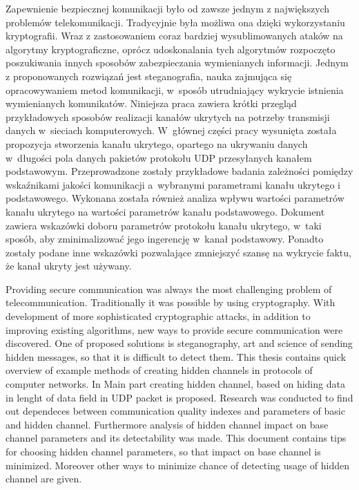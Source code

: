 \documentclass[a4paper, twoside, 12pt]{report}
\newenvironment{abstractpage}
  {\vspace*{\fill}\thispagestyle{empty}}
    {\vfill}
\renewenvironment{abstract}[1]
      {\bigskip\selectlanguage{#1}%
             \begin{center}\bfseries\abstractname\end{center}}
           {\par\bigskip}
\begin{document}



\begin{abstractpage}
\begin{abstract}{polish}
    Zapewnienie bezpiecznej komunikacji było od zawsze jednym z największych
    problemów telekomunikacji. Tradycyjnie była możliwa ona
    dzięki wykorzystaniu kryptografii. Wraz z zastosowaniem coraz bardziej wysublimowanych
    ataków na algorytmy kryptograficzne, oprócz udoskonalania tych algorytmów rozpoczęto
    poszukiwania innych sposobów zabezpieczania wymienianych informacji. Jednym
    z proponowanych rozwiązań jest steganografia, nauka zajmująca się opracowywaniem
    metod komunikacji, w~sposób utrudniający wykrycie istnienia wymienianych komunikatów.
    Niniejsza praca zawiera krótki przegląd przykładowych sposobów
    realizacji kanałów ukrytych na potrzeby transmisji danych w~sieciach komputerowych.
    W~głównej części pracy wysunięta została propozycja stworzenia kanału ukrytego, opartego na ukrywaniu
    danych w~długości pola danych pakietów protokołu UDP przesyłanych kanałem podstawowym.
    Przeprowadzone
    zostały przykładowe badania zależności pomiędzy wskaźnikami jakości komunikacji
    a~wybranymi parametrami kanału ukrytego i podstawowego. Wykonana została również
    analiza wpływu wartości parametrów kanału ukrytego na wartości parametrów kanału podstawowego.
    Dokument zawiera wskazówki doboru parametrów protokołu kanału ukrytego, w~taki sposób, aby
    zminimalizować jego ingerencję w~kanał podstawowy. Ponadto zostały podane inne
    wskazówki pozwalające zmniejszyć szansę na wykrycie faktu, że kanał ukryty jest
    używany.
\end{abstract}

\begin{abstract}{english}
    Providing secure communication was always the most challenging problem
    of telecommunication. Traditionally it was possible by
    using cryptography. With development of more sophisticated cryptographic attacks,
    in addition to improving existing algorithms, new ways to provide secure communication
    were discovered. One of proposed solutions is steganography, art and science
    of sending hidden messages, so that it is difficult to detect them. This thesis
    contains quick overview of example methods of creating hidden channels in
    protocols of computer networks. In Main part creating
    hidden channel, based on hiding data in lenght of data field in UDP packet is proposed. Research was
    conducted to find out dependeces between communication quality indexes and parameters
    of basic and hidden channel. Furthermore analysis of hidden channel impact on base channel parameters
    and its detectability was made. This document contains tips for choosing hidden
    channel parameters, so that impact on base channel is minimized. Moreover
    other ways to minimize chance of detecting usage of hidden channel are given.
\end{abstract}
\end{abstractpage}
\end{document}
